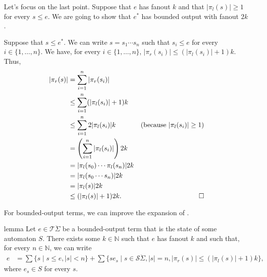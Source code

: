 \documentclass[a4paper,UKenglish,cleveref, autoref, thm-restate]{lipics-v2021}
\begin{document}
\begin{proofEnd}
  Let's focus on the last point.  Suppose that $e$ has fanout $k$ and that
  $| \pi _l(s)|  \geq  1$ for every $s  \leq  e$.  We are going to show that $e^*$ has bounded
  output with fanout $2k$.

  Suppose that $s  \leq  e^*$.  We can write $s = s_1  \cdots  s_n$ such that $s_i  \leq  e$ for
  every $i  \in  \{1,  \ldots , n\}$.  We have, for every $i  \in  \{1, \ldots ,n\}$,
  $| \pi _r(s_i)|  \leq  (| \pi _l(s_i)| + 1)k.$ Thus,
  \begin{align*}
    | \pi _r(s)|
    & =  \sum _{i=1}^n | \pi _r(s_i)| \\
    &  \leq   \sum _{i=1}^n (| \pi _l(s_i)| + 1)k \\
    &  \leq   \sum _{i=1}^n 2| \pi _l(s_i)|k
    & (\text{because $| \pi _l(s_i)|  \geq  1$}) \\
    & = \left( \sum _{i=1}^n| \pi _l(s_i)|\right)2k \\
    & = | \pi _l(s_0)  \cdots   \pi _l(s_n)|2k\\
    & = | \pi _l(s_0  \cdots  s_n)|2k  \\
    & = | \pi _l(s)|2k \\
    &  \leq  (| \pi _l(s)| + 1)2k. & \qedhere
  \end{align*}
\end{proofEnd}

For bounded-output terms, we can improve the expansion of .

\begin{theoremEnd}{lemma}
  \label{lem:expansion-bounded-output}
  Let $e  \in  \mathcal{T}\ddot{ \Sigma }$ be a bounded-output term that is the state of
  some automaton $S$. There exists some $k  \in  \mathbb{N}$ such that $e$ has fanout $k$ and
  such that, for every $n  \in  \mathbb{N}$, we can write
  \begin{align*}
    e
    & =  \sum \{s \mid s  \leq  e, |s| < n\} + %
     \sum \{se_s \mid s  \in  \mathcal{S}\ddot{ \Sigma }, |s|=n, | \pi _r(s)|  \leq  (| \pi _l(s)|+1)k\},
  \end{align*}
  where $e_s  \in  S$ for every $s$.
\end{theoremEnd}
\end{document}
